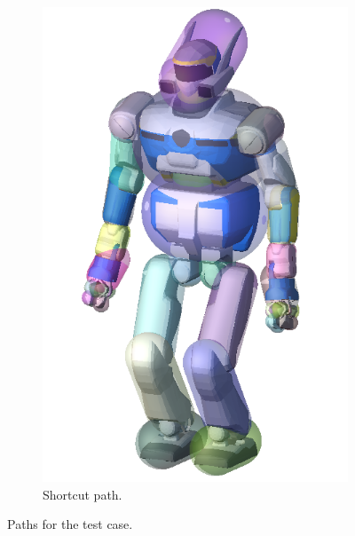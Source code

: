 \begin{figure}
\begin{subfigure}{0.48\columnwidth}
    \includegraphics[width = \columnwidth]
                    {src/chap3-optimal-motion-planning/figure/hrp2-capsule.png}
    \caption{Shortcut path.}
    \label{simple-path-sol-shortcuta}
  \end{subfigure}
  \caption{Paths for the test case.}
\end{figure}

